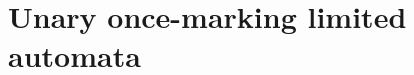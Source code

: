 \chapter{Unary once-marking limited automata}

\begin{table}
	\caption{Descriptional complexity of the simulations between basic regular language recognisers and once-marking $1$-limited automata, unary case.}
	\label{tab:sims-om-unary}
\end{table}

